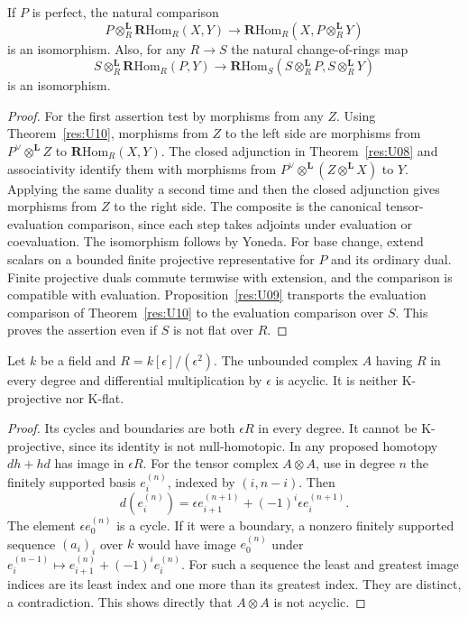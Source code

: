 \begin{proposition}\label{res:U11}
If \(P\) is perfect, the natural comparison
\[
 P\otimes_R^{\mathbf L}\mathbf R\mathrm{Hom}_R(X,Y)
 \longrightarrow
 \mathbf R\mathrm{Hom}_R(X,P\otimes_R^{\mathbf L}Y)
\]
is an isomorphism. Also, for any \(R\to S\) the natural
change-of-rings map
\[
 S\otimes_R^{\mathbf L}\mathbf R\mathrm{Hom}_R(P,Y)
  \longrightarrow
 \mathbf R\mathrm{Hom}_S(S\otimes_R^{\mathbf L}P,
                          S\otimes_R^{\mathbf L}Y)
\]
is an isomorphism.
\end{proposition}
\begin{proof}
For the first assertion test by morphisms from any \(Z\).
Using Theorem~\ref{res:U10}, morphisms from \(Z\) to the
left side are morphisms from \(P^\vee\otimes^{\mathbf L}Z\)
to \(\mathbf R\mathrm{Hom}_R(X,Y)\). The closed adjunction
in Theorem~\ref{res:U08} and associativity identify them with
morphisms from \(P^\vee\otimes^{\mathbf L}(Z\otimes^{\mathbf L}X)\)
to \(Y\). Applying the same duality a second time and
then the closed adjunction gives morphisms from \(Z\) to the
right side. The composite is the canonical tensor-evaluation
comparison, since each step takes adjoints under evaluation
or coevaluation. The isomorphism follows by Yoneda.
For base change, extend scalars on a bounded finite
projective representative for \(P\) and its ordinary dual.
Finite projective duals commute termwise with extension,
and the comparison is compatible with evaluation.
Proposition~\ref{res:U09} transports the evaluation comparison
of Theorem~\ref{res:U10} to the evaluation comparison over \(S\).
This proves the assertion even if \(S\) is not flat over \(R\).
\end{proof}

\begin{example}\label{res:U12}
Let \(k\) be a field and \(R=k[\epsilon]/(\epsilon^2)\).
The unbounded complex \(A\) having \(R\) in every degree and
differential multiplication by \(\epsilon\) is acyclic.
It is neither K-projective nor K-flat.
\end{example}
\begin{proof}
Its cycles and boundaries are both \(\epsilon R\) in every degree.
It cannot be K-projective, since its identity is not null-homotopic.
In any proposed homotopy \(d h+h d\) has image in \(\epsilon R\).
For the tensor complex \(A\otimes A\), use in degree \(n\) the
finitely supported basis \(e_i^{(n)}\), indexed by \((i,n-i)\).
Then
\[
 d(e_i^{(n)})=\epsilon e_{i+1}^{(n+1)}
                 +(-1)^i\epsilon e_i^{(n+1)}.
\]
The element \(\epsilon e_0^{(n)}\) is a cycle. If it were a boundary,
a nonzero finitely supported sequence \((a_i)_i\) over \(k\)
would have image \(e_0^{(n)}\) under
\(e_i^{(n-1)}\mapsto e_{i+1}^{(n)}+(-1)^i e_i^{(n)}\).
For such a sequence the least and greatest image indices are its
least index and one more than its greatest index. They are
distinct, a contradiction. This shows directly that \(A\otimes A\)
is not acyclic.
\end{proof}


